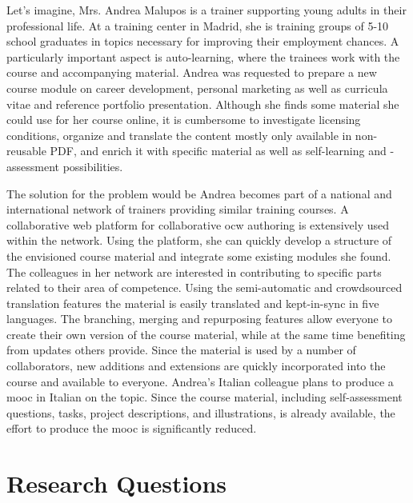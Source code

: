 \documentclass[PhD, Submit, ngerman,UKenglish,table]{scrbook}
\begin{document}
Let's imagine, Mrs. Andrea Malupos is a trainer supporting young adults in their professional life.
At a training center in Madrid, she is training groups of 5-10 school graduates in topics necessary for improving their employment chances.
A particularly important aspect is auto-learning, where the trainees work with the course and accompanying material.
Andrea was requested to prepare a new course module on career development, personal marketing as well as curricula vitae and reference portfolio presentation.
Although she finds some material she could use for her course online, it is cumbersome to investigate licensing conditions, organize and translate the content mostly only available in non-reusable PDF, and enrich it with specific material as well as self-learning and -assessment possibilities.

The solution for the problem would be Andrea becomes part of a national and international network of trainers providing similar training courses.
A collaborative web platform for collaborative \gls{ocw} authoring is extensively used within the network.
Using the platform, she can quickly develop a structure of the envisioned course material and integrate some existing modules she found.
The colleagues in her network are interested in contributing to specific parts related to their area of competence. 
Using the semi-automatic and crowdsourced translation features the material is easily translated and kept-in-sync in five languages.
The branching, merging and repurposing features allow everyone to create their own version of the course material, while at the same time benefiting from updates others provide.
Since the material is used by a number of collaborators, new additions and extensions are quickly incorporated into the course and available to everyone.
Andrea's Italian colleague plans to produce a \gls{mooc} in Italian on the topic.
Since the course material, including self-assessment questions, tasks, project descriptions, and illustrations, is already available, the effort to produce the \gls{mooc} is significantly reduced.

\section{Research Questions}
\label{section:approach_overview}
\end{document}
